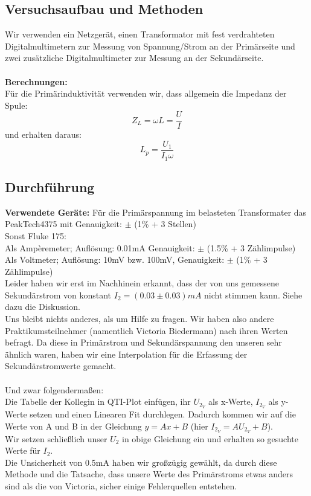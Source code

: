 \documentclass{article}
\begin{document}
\subsection{Versuchsaufbau und Methoden}
Wir verwenden ein Netzgerät, einen Transformator mit fest verdrahteten Digitalmultimetern zur Messung von Spannung/Strom an der Primärseite und zwei zusätzliche Digitalmultimeter zur Messung an der Sekundärseite.\\
\\
\textbf{Berechnungen:}\\
Für die Primärinduktivität verwenden wir, dass allgemein die Impedanz der Spule:
$$Z_L=\omega L = \frac{U}{I}$$
und erhalten daraus:
\begin{equation}
\label{Induktivitaet}
L_p=\frac{U_1}{I_1 \omega}
\end{equation}


\subsection{Durchführung}
\textbf{Verwendete Geräte:}
Für die Primärspannung im belasteten Transformater das PeakTech4375 mit Genauigkeit: $\pm$ (1\% + 3 Stellen)\\
Sonst Fluke 175:\\
Als Ampèremeter; Auflösung: 0.01mA Genauigkeit: $\pm$ (1.5\% + 3 Zählimpulse)\\
Als Voltmeter; Auflösung: 10mV bzw. 100mV, Genauigkeit: $\pm$ (1\% + 3 Zählimpulse)\\

Leider haben wir erst im Nachhinein erkannt, dass der von uns gemessene Sekundärstrom von konstant $I_2=(0.03 \pm 0.03)mA$ nicht stimmen kann. Siehe dazu die Diskussion.\\
Uns bleibt nichts anderes, als um Hilfe zu fragen. Wir haben also andere Praktikumsteilnehmer (namentlich Victoria Biedermann) nach ihren Werten befragt. Da diese in Primärstrom und Sekundärspannung den unseren sehr ähnlich waren, haben wir eine Interpolation für die Erfassung der Sekundärstromwerte gemacht.\\
\\
Und zwar folgendermaßen:\\
Die Tabelle der Kollegin in QTI-Plot einfügen, ihr $U_{2_V}$ als x-Werte, $I_{2_V}$ als y-Werte setzen und einen Linearen Fit durchlegen. Dadurch kommen wir auf die Werte von A und B in der Gleichung $y=Ax+B$ (hier $I_{2_V}=AU_{2_V}+B$).\\
Wir setzen schließlich unser $U_2$ in obige Gleichung ein und erhalten so gesuchte Werte für $I_2$.\\
Die Unsicherheit von 0.5mA haben wir großzügig gewählt, da durch diese Methode und die Tatsache, dass unsere Werte des Primärstroms etwas anders sind als die von Victoria, sicher einige Fehlerquellen entstehen.
\end{document}
